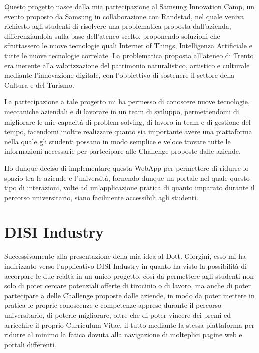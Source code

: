 Questo progetto nasce dalla mia partecipazione al Samsung Innovation Camp, un evento proposto da Samsung in collaborazione con Randstad, nel quale veniva richiesto agli studenti di risolvere una problematica proposta dall'azienda, differenziandola sulla base dell'ateneo scelto, proponendo soluzioni che sfruttassero le nuove tecnologie quali Internet of Things, Intelligenza Artificiale e tutte le nuove tecnologie correlate. La problematica proposta all'ateneo di Trento era inerente alla valorizzazione del patrimonio naturalistico, artistico e culturale mediante l'innovazione digitale, con l'obbiettivo di sostenere il settore della Cultura e del Turismo.

La partecipazione a tale progetto mi ha permesso di conoscere nuove tecnologie, meccaniche aziendali e di lavorare in un team di sviluppo, permettendomi di migliorare le mie capacità di problem solving, di lavoro in team e di gestione del tempo, facendomi inoltre realizzare quanto sia importante avere una piattaforma nella quale gli studenti possano in modo semplice e veloce trovare tutte le informazioni necessarie per partecipare alle Challenge proposte dalle aziende.

Ho dunque deciso di implementare questa WebApp per permettere di ridurre lo spazio tra le aziende e l'università, fornendo dunque un portale nel quale questo tipo di interazioni, volte ad un'applicazione pratica di quanto imparato durante il percorso universitario, siano facilmente accessibili agli studenti.



\section{DISI Industry}
\label{sec:context}

Successivamente alla presentazione della mia idea al Dott. Giorgini, esso mi ha indirizzato verso l'applicativo DISI Industry in quanto ha visto la possibilità di accorpare le due realtà in un unico progetto, così da permettere agli studenti non solo di poter cercare potenziali offerte di tirocinio o di lavoro, ma anche di poter partecipare a delle Challenge proposte dalle aziende, in modo da poter mettere in pratica le proprie conoscenze e competenze apprese durante il percorso universitario, di poterle migliorare, oltre che di poter vincere dei premi ed arricchire il proprio Curriculum Vitae, il tutto mediante la stessa piattaforma per ridurre al minimo la fatica dovuta alla navigazione di molteplici pagine web e portali differenti.


